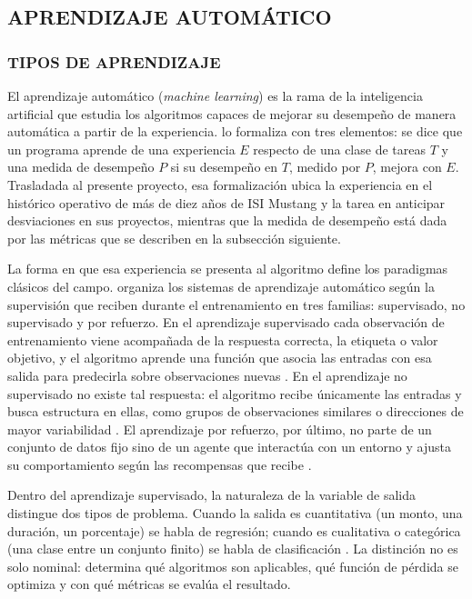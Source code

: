 \subsection{APRENDIZAJE AUTOMÁTICO}
\subsubsection{TIPOS DE APRENDIZAJE}

El aprendizaje automático (\textit{machine learning}) es la rama de la inteligencia artificial que estudia los algoritmos capaces de mejorar su desempeño de manera automática a partir de la experiencia. \textcite{Mitchell1997} lo formaliza con tres elementos: se dice que un programa aprende de una experiencia $E$ respecto de una clase de tareas $T$ y una medida de desempeño $P$ si su desempeño en $T$, medido por $P$, mejora con $E$. Trasladada al presente proyecto, esa formalización ubica la experiencia en el histórico operativo de más de diez años de ISI Mustang y la tarea en anticipar desviaciones en sus proyectos, mientras que la medida de desempeño está dada por las métricas que se describen en la subsección siguiente.

La forma en que esa experiencia se presenta al algoritmo define los paradigmas clásicos del campo. \textcite{Geron2022} organiza los sistemas de aprendizaje automático según la supervisión que reciben durante el entrenamiento en tres familias: supervisado, no supervisado y por refuerzo. En el aprendizaje supervisado cada observación de entrenamiento viene acompañada de la respuesta correcta, la etiqueta o valor objetivo, y el algoritmo aprende una función que asocia las entradas con esa salida para predecirla sobre observaciones nuevas \parencite{Hastie2009}. En el aprendizaje no supervisado no existe tal respuesta: el algoritmo recibe únicamente las entradas y busca estructura en ellas, como grupos de observaciones similares o direcciones de mayor variabilidad \parencite{James2021}. El aprendizaje por refuerzo, por último, no parte de un conjunto de datos fijo sino de un agente que interactúa con un entorno y ajusta su comportamiento según las recompensas que recibe \parencite{Mitchell1997}.

Dentro del aprendizaje supervisado, la naturaleza de la variable de salida distingue dos tipos de problema. Cuando la salida es cuantitativa (un monto, una duración, un porcentaje) se habla de regresión; cuando es cualitativa o categórica (una clase entre un conjunto finito) se habla de clasificación \parencite{Hastie2009, James2021}. La distinción no es solo nominal: determina qué algoritmos son aplicables, qué función de pérdida se optimiza y con qué métricas se evalúa el resultado.

